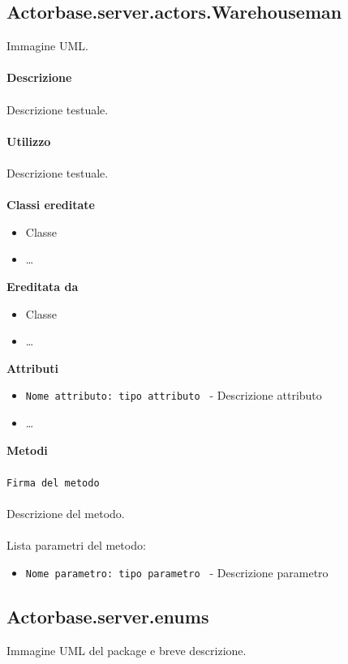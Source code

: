 \documentclass[a4paper]{article}
\begin{document}
	\subsection{Actorbase.server.actors.Warehouseman}
		Immagine UML.
		\\ \\
		\textbf{Descrizione}
			\\ \\
			Descrizione testuale.
			\\ \\
		\textbf{Utilizzo}
			\\ \\
			Descrizione testuale.
			\\ \\
		\textbf{Classi ereditate}
			\begin{itemize}
				\item Classe
				\item \dots
			\end{itemize}
		\textbf{Ereditata da}
			\begin{itemize}
				\item Classe
				\item \dots
			\end{itemize}
		\textbf{Attributi}
			\begin{itemize}
				\item \texttt{Nome attributo: tipo attributo } - Descrizione attributo
				\item \dots
			\end{itemize}
		\textbf{Metodi}
			\\ \\
			\texttt{Firma del metodo}
			\\ \\
			Descrizione del metodo.
			\\ \\
			Lista parametri del metodo:
			\begin{itemize}
				\item \texttt{Nome parametro: tipo parametro } - Descrizione parametro
			\end{itemize}
			
	\subsection{Actorbase.server.enums}
		Immagine UML del package e breve descrizione.
		
\end{document}
